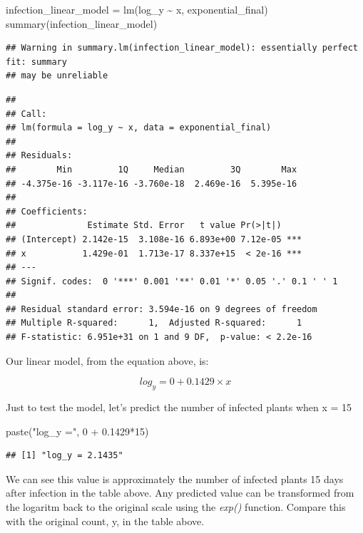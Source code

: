 \documentclass[
]{book}
\newenvironment{Shaded}{\begin{snugshade}}{\end{snugshade}}
\newcommand{\DecValTok}[1]{\textcolor[rgb]{0.00,0.00,0.81}{#1}}
\newcommand{\FloatTok}[1]{\textcolor[rgb]{0.00,0.00,0.81}{#1}}
\newcommand{\FunctionTok}[1]{\textcolor[rgb]{0.00,0.00,0.00}{#1}}
\newcommand{\NormalTok}[1]{#1}
\newcommand{\OtherTok}[1]{\textcolor[rgb]{0.56,0.35,0.01}{#1}}
\newcommand{\SpecialCharTok}[1]{\textcolor[rgb]{0.00,0.00,0.00}{#1}}
\newcommand{\StringTok}[1]{\textcolor[rgb]{0.31,0.60,0.02}{#1}}
\begin{document}
\begin{Shaded}
\begin{Highlighting}[]
\NormalTok{infection\_linear\_model }\OtherTok{=} \FunctionTok{lm}\NormalTok{(log\_y }\SpecialCharTok{\textasciitilde{}}\NormalTok{ x, exponential\_final)}
\FunctionTok{summary}\NormalTok{(infection\_linear\_model)}
\end{Highlighting}
\end{Shaded}

\begin{verbatim}
## Warning in summary.lm(infection_linear_model): essentially perfect fit: summary
## may be unreliable
\end{verbatim}

\begin{verbatim}
## 
## Call:
## lm(formula = log_y ~ x, data = exponential_final)
## 
## Residuals:
##        Min         1Q     Median         3Q        Max 
## -4.375e-16 -3.117e-16 -3.760e-18  2.469e-16  5.395e-16 
## 
## Coefficients:
##              Estimate Std. Error   t value Pr(>|t|)    
## (Intercept) 2.142e-15  3.108e-16 6.893e+00 7.12e-05 ***
## x           1.429e-01  1.713e-17 8.337e+15  < 2e-16 ***
## ---
## Signif. codes:  0 '***' 0.001 '**' 0.01 '*' 0.05 '.' 0.1 ' ' 1
## 
## Residual standard error: 3.594e-16 on 9 degrees of freedom
## Multiple R-squared:      1,  Adjusted R-squared:      1 
## F-statistic: 6.951e+31 on 1 and 9 DF,  p-value: < 2.2e-16
\end{verbatim}

Our linear model, from the equation above, is:

\[ log_y = 0 + 0.1429 \times x\]

Just to test the model, let's predict the number of infected plants when x = 15

\begin{Shaded}
\begin{Highlighting}[]
\FunctionTok{paste}\NormalTok{(}\StringTok{"log\_y ="}\NormalTok{, }\DecValTok{0} \SpecialCharTok{+} \FloatTok{0.1429}\SpecialCharTok{*}\DecValTok{15}\NormalTok{)}
\end{Highlighting}
\end{Shaded}

\begin{verbatim}
## [1] "log_y = 2.1435"
\end{verbatim}

We can see this value is approximately the number of infected plants 15 days after infection in the table above. Any predicted value can be transformed from the logaritm back to the original scale using the \emph{exp()} function. Compare this with the original count, y, in the table above.
\end{document}
